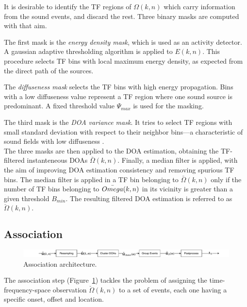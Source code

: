 It is desirable to identify the TF regions of $\Omega(k,n)$ which carry information from the sound events, and discard the rest. Three binary masks are computed with that aim.

The first mask is the \textit{energy density mask}, which is used as an activity detector. A gaussian adaptive thresholding algorithm is applied to $E(k,n)$. This procedure selects TF bins with local maximum energy density, as expected from the direct path of the sources.

The \textit{diffuseness mask} selects the TF bins with high energy propagation. Bins with a low diffuseness value represent a TF region where one sound source is predominant. A fixed threshold value $\Psi_{max}$ is used for the masking.

The third mask is the \textit{DOA variance mask}. It tries to select TF regions with small standard deviation with respect to their neighbor bins---a characteristic of sound fields with low diffuseness \cite{pulkki2018parametric}.\\

The three masks are then applied to the DOA estimation, obtaining the TF-filtered instanteneous DOAs $\bar{\Omega}(k,n)$. 
Finally, a median filter is applied, with the aim of improving DOA estimation consistency and removing spurious TF bins.
The median filter is applied in a TF bin belonging to $\bar{\Omega}(k,n)$ only if the number of TF bins belonging to $\bar{\\Omega}(k,n)$ in its vicinity is greater than a given threshold $B_{min}$.
The resulting filtered DOA estimation is referred to as $\breve{\Omega}(k,n)$.


\subsection{Association}
\label{ssec:association}

\begin{figure}[h]
    \includegraphics[width=\textwidth]{Figures/SELD//ASS.pdf}
    \caption{Association architecture.}
    \label{fig:association}

\end{figure}

The association step (Figure~\ref{fig:association}) tackles the problem of assigning the time-frequency-space observation $\breve{\Omega}(k,n)$ to a set of events, each one having a specific onset, offset and location. \\

